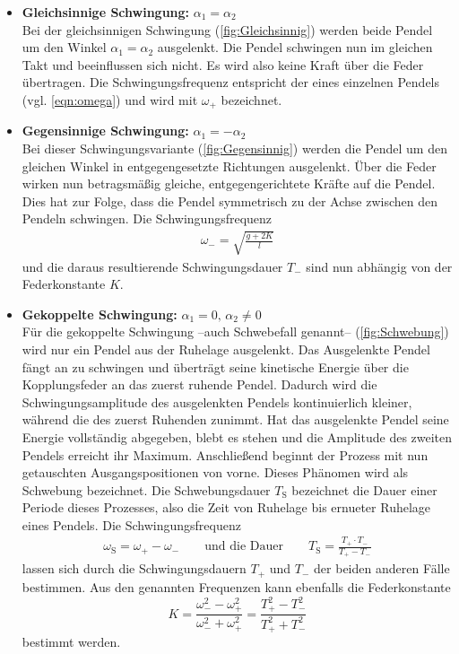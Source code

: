 \begin{itemize}
    \item \textbf{Gleichsinnige Schwingung:} $\alpha_1 = \alpha_2$ \\
    Bei der gleichsinnigen Schwingung (\autoref{fig:Gleichsinnig}) werden beide Pendel um den Winkel $\alpha_1 = \alpha_2$ ausgelenkt. Die Pendel schwingen nun im gleichen Takt und beeinflussen sich nicht.
    Es wird also keine Kraft über die Feder übertragen. Die Schwingungsfrequenz entspricht der eines einzelnen Pendels (vgl. \autoref{eqn:omega}) und wird mit $\omega_+$ bezeichnet.

    \item \textbf{Gegensinnige Schwingung:} $\alpha_1 = -\alpha_2$ \\
    Bei dieser Schwingungsvariante (\autoref{fig:Gegensinnig}) werden die Pendel um den gleichen Winkel in entgegengesetzte Richtungen ausgelenkt. Über die Feder wirken nun betragsmäßig gleiche,
    entgegengerichtete Kräfte auf die Pendel. Dies hat zur Folge, dass die Pendel symmetrisch zu der Achse zwischen den Pendeln schwingen. Die Schwingungsfrequenz 
    \begin{gather}
        \label{eqn:omega_Gegensinnig}
        \omega_- = \sqrt{\frac{g + 2K}{l}}
    \end{gather}
    und die daraus resultierende Schwingungsdauer $T_-$ sind nun abhängig von der Federkonstante $K$. 
    
    \item \textbf{Gekoppelte Schwingung:} $\alpha_1 = 0, \, \alpha_2 \neq 0$ \\
    Für die gekoppelte Schwingung --auch Schwebefall genannt-- (\autoref{fig:Schwebung}) wird nur ein Pendel aus der Ruhelage ausgelenkt. Das Ausgelenkte Pendel fängt an zu schwingen und überträgt seine 
    kinetische Energie über die Kopplungsfeder an das zuerst ruhende Pendel. Dadurch wird die Schwingungsamplitude des ausgelenkten Pendels kontinuierlich kleiner, während
    die des zuerst Ruhenden zunimmt. Hat das ausgelenkte Pendel seine Energie vollständig abgegeben, blebt es stehen und die Amplitude des zweiten Pendels erreicht ihr Maximum.
    Anschließend beginnt der Prozess mit nun getauschten Ausgangspositionen von vorne. Dieses Phänomen wird als Schwebung bezeichnet. Die Schwebungsdauer $T_{\text{S}}$ bezeichnet 
    die Dauer einer Periode dieses Prozesses, also die Zeit von Ruhelage bis ernueter Ruhelage eines Pendels. Die Schwingungsfrequenz
    \begin{gather}
        \label{eqn:Schwebung}
        \omega_{\text{S}} = \omega_+ - \omega_- \qquad \text{und die Dauer} \qquad T_{\text{S}}  = \frac{T_+ \cdot T_-}{T_+ - T_-}
    \end{gather}
    lassen sich durch die Schwingungsdauern $T_+$ und $T_-$ der beiden anderen Fälle bestimmen.
    Aus den genannten Frequenzen kann ebenfalls die Federkonstante
    \begin{equation}
        \label{eqn:Federkonstante}
        K = \frac{\omega_-^2 - \omega_+^2}{\omega_-^2 + \omega_+^2} = \frac{T_+^2 - T_-^2}{T_+^2 + T_-^2}
    \end{equation}
    bestimmt werden.
\end{itemize}

